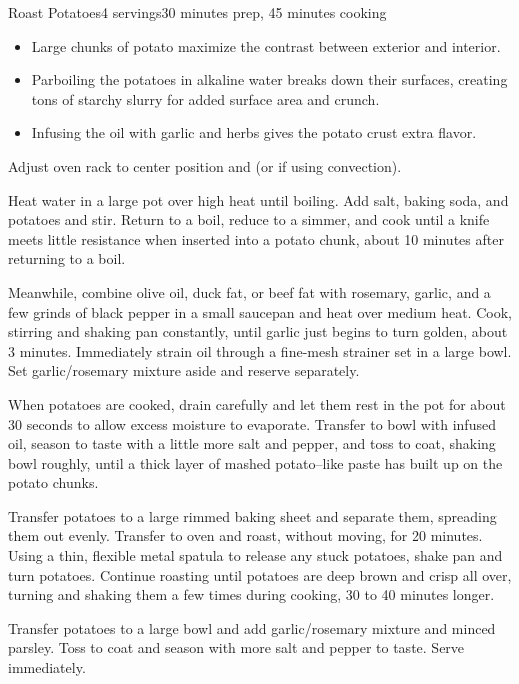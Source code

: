 \documentclass[../Cookbook.tex]{subfiles}
\begin{document}
\begin{recipe}{Roast Potatoes}{4 servings}{30 minutes prep, 45 minutes cooking}

\begin{itemize}
	\item Large chunks of potato maximize the contrast between exterior and interior.
	\item Parboiling the potatoes in alkaline water breaks down their surfaces, creating tons of starchy slurry for added surface area and crunch.
	\item Infusing the oil with garlic and herbs gives the potato crust extra flavor.
\end{itemize}

Adjust oven rack to center position and  (or  if using convection).

Heat water in a large pot over high heat until boiling. Add salt, baking soda, and potatoes and stir. Return to a boil, reduce to a simmer, and cook until a knife meets little resistance when inserted into a potato chunk, about 10 minutes after returning to a boil.

Meanwhile, combine olive oil, duck fat, or beef fat with rosemary, garlic, and a few grinds of black pepper in a small saucepan and heat over medium heat. Cook, stirring and shaking pan constantly, until garlic just begins to turn golden, about 3 minutes. Immediately strain oil through a fine-mesh strainer set in a large bowl. Set garlic/rosemary mixture aside and reserve separately.

\newstep
When potatoes are cooked, drain carefully and let them rest in the pot for about 30 seconds to allow excess moisture to evaporate. Transfer to bowl with infused oil, season to taste with a little more salt and pepper, and toss to coat, shaking bowl roughly, until a thick layer of mashed potato–like paste has built up on the potato chunks.

\newstep
Transfer potatoes to a large rimmed baking sheet and separate them, spreading them out evenly. Transfer to oven and roast, without moving, for 20 minutes. Using a thin, flexible metal spatula to release any stuck potatoes, shake pan and turn potatoes. Continue roasting until potatoes are deep brown and crisp all over, turning and shaking them a few times during cooking, 30 to 40 minutes longer.

\newstep
Transfer potatoes to a large bowl and add garlic/rosemary mixture and minced parsley. Toss to coat and season with more salt and pepper to taste. Serve immediately.

\end{recipe}
\end{document}

